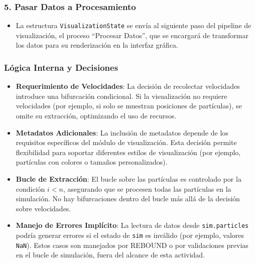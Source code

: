 \subsubsection*{5. Pasar Datos a Procesamiento}
\begin{itemize}
    \item La estructura \texttt{VisualizationState} se envía al siguiente paso del pipeline de visualización, el proceso ``Procesar Datos'', que se encargará de transformar los datos para su renderización en la interfaz gráfica.
\end{itemize}

\subsubsection{Lógica Interna y Decisiones}
\begin{itemize}
    \item \textbf{Requerimiento de Velocidades}: La decisión de recolectar velocidades introduce una bifurcación condicional. Si la visualización no requiere velocidades (por ejemplo, si solo se muestran posiciones de partículas), se omite su extracción, optimizando el uso de recursos.
    \item \textbf{Metadatos Adicionales}: La inclusión de metadatos depende de los requisitos específicos del módulo de visualización. Esta decisión permite flexibilidad para soportar diferentes estilos de visualización (por ejemplo, partículas con colores o tamaños personalizados).
    \item \textbf{Bucle de Extracción}: El bucle sobre las partículas es controlado por la condición $i < n$, asegurando que se procesen todas las partículas en la simulación. No hay bifurcaciones dentro del bucle más allá de la decisión sobre velocidades.
    \item \textbf{Manejo de Errores Implícito}: La lectura de datos desde \texttt{sim.particles} podría generar errores si el estado de \texttt{sim} es inválido (por ejemplo, valores \texttt{NaN}). Estos casos son manejados por REBOUND o por validaciones previas en el bucle de simulación, fuera del alcance de esta actividad.
\end{itemize}

